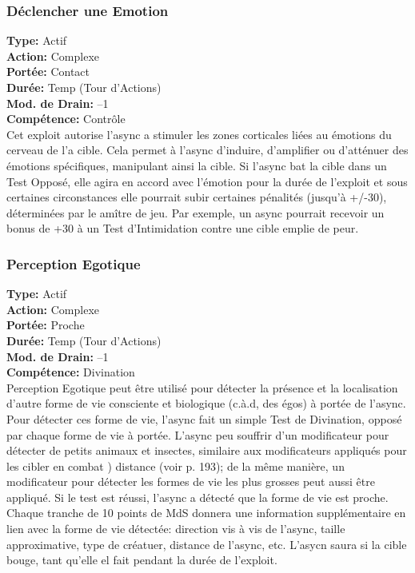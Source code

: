 \subsubsection{Déclencher une Emotion} \textbf{Type:} Actif \\ \textbf{Action:} Complexe \\ \textbf{Portée:} Contact \\ \textbf{Durée:} Temp (Tour d'Actions) \\ \textbf{Mod. de Drain:} –1 \\ \textbf{Compétence:} Contrôle \\ Cet exploit autorise l'async a stimuler les zones corticales liées au émotions du cerveau de l'a cible. Cela permet à l'async d'induire, d'amplifier ou d'atténuer des émotions spécifiques, manipulant ainsi la cible. Si l'async bat la cible dans un Test Opposé, elle agira en accord avec l'émotion pour la durée de l'exploit et sous certaines circonstances elle pourrait subir certaines pénalités (jusqu'à +/-30), déterminées par le amître de jeu. Par exemple, un async pourrait recevoir un bonus de +30 à un Test d'Intimidation contre une cible emplie de peur. 

\subsubsection{Perception Egotique} \textbf{Type:} Actif \\ \textbf{Action:} Complexe \\ \textbf{Portée:} Proche \\ \textbf{Durée:} Temp (Tour d'Actions) \\ \textbf{Mod. de Drain:} –1 \\ \textbf{Compétence:} Divination \\ Perception Egotique peut être utilisé pour détecter la présence et la localisation d'autre  forme de vie consciente et biologique (c.à.d, des égos) à portée de l'async. Pour détecter ces forme de vie, l'async fait un simple Test de Divination, opposé par chaque forme de vie à portée. L'async peu souffrir d'un modificateur pour détecter de petits animaux et insectes, similaire aux modificateurs appliqués pour les cibler en combat ) distance (voir p. 193); de la même manière, un modificateur pour détecter les formes de vie les plus grosses peut aussi être appliqué. Si le test est réussi, l'async a détecté que la forme de vie est proche. Chaque tranche de 10 points de MdS donnera une information supplémentaire en lien avec la forme de vie détectée: direction vis à vis de l'async, taille approximative, type de créatuer, distance de l'async, etc. L'asycn saura si la cible bouge, tant qu'elle el fait pendant la durée de l'exploit. 

